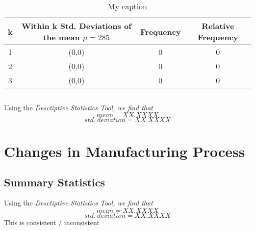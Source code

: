 \documentclass[letterpaper]{article}
\begin{document}
\subsection{}

\begin{table}[H]
 \centering
 \begin{tabular}{|c|c|c|c|}
  \hline
  \textbf{k} & \textbf{Within k Std. Deviations of the mean $\mu=285$} & \textbf{Frequency} & \textbf{Relative Frequency} \\ \hline
  1          & (0,0)                                                   & 0                  & 0                           \\ \hline
  2          & (0,0)                                                   & 0                  & 0                           \\ \hline
  3          & (0,0)                                                   & 0                  & 0                           \\ \hline
 \end{tabular}
 \caption{My caption}
 \label{my-label}
\end{table}

\subsection{} %

\subsection{} %
Using the \textit{Desctiptive Statistics Tool, we find that}
$${mean} = XX.XXXX$$
$${std.\ deviation} = XX.XXXX$$

\section{Changes in Manufacturing Process}%

\subsection{Summary Statistics} %
Using the \textit{Desctiptive Statistics Tool, we find that}
$${mean} = XX.XXXX$$
$${std.\ deviation} = XX.XXXX$$
This is consistent / inconsistent
\end{document}

